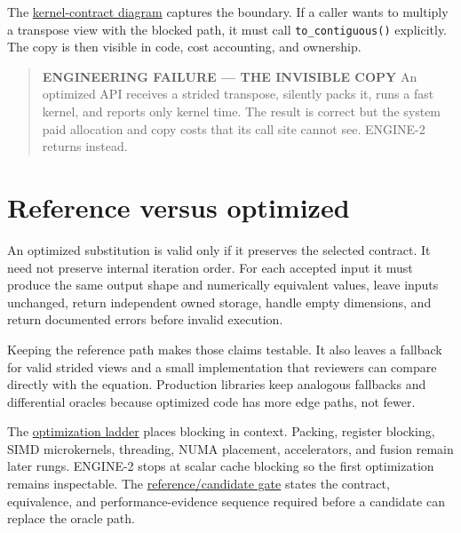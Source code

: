 The
\href{https://github.com/hermonai/inside-the-llm-engine/blob/astra-visual-rewrite/diagrams/linear/reference-vs-blocked-kernel.txt}{kernel-contract
diagram} captures the boundary. If a caller wants to multiply a
transpose view with the blocked path, it must call
\texttt{to\_contiguous()} explicitly. The copy is then visible in code,
cost accounting, and ownership.

\begin{quote}
\textbf{ENGINEERING FAILURE --- THE INVISIBLE COPY} An optimized API
receives a strided transpose, silently packs it, runs a fast kernel, and
reports only kernel time. The result is correct but the system paid
allocation and copy costs that its call site cannot see. ENGINE-2
returns \texttt{} instead.
\end{quote}

\section{Reference versus
optimized}\label{reference-versus-optimized}

An optimized substitution is valid only if it preserves the selected
contract. It need not preserve internal iteration order. For each
accepted input it must produce the same output shape and numerically
equivalent values, leave inputs unchanged, return independent owned
storage, handle empty dimensions, and return documented errors before
invalid execution.

Keeping the reference path makes those claims testable. It also leaves a
fallback for valid strided views and a small implementation that
reviewers can compare directly with the equation. Production libraries
keep analogous fallbacks and differential oracles because optimized code
has more edge paths, not fewer.

The
\href{https://github.com/hermonai/inside-the-llm-engine/blob/astra-visual-rewrite/diagrams/linear/optimization-ladder.txt}{optimization
ladder} places blocking in context. Packing, register blocking, SIMD
microkernels, threading, NUMA placement, accelerators, and fusion remain
later rungs. ENGINE-2 stops at scalar cache blocking so the first
optimization remains inspectable. The
\href{https://github.com/hermonai/inside-the-llm-engine/blob/astra-visual-rewrite/diagrams/linear/reference-candidate-gates.txt}{reference/candidate
gate} states the contract, equivalence, and performance-evidence
sequence required before a candidate can replace the oracle path.

